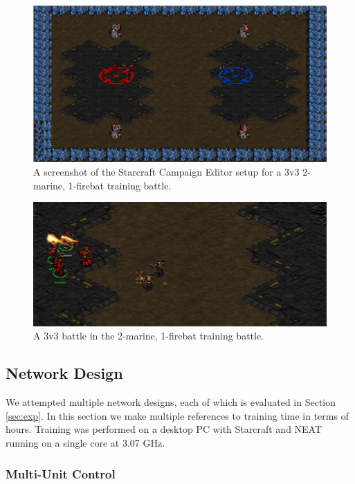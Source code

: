 \documentclass[10pt,a4paper,twocolumn]{article}
\begin{document}
\begin{figure}
\includegraphics[scale=.28]{figures/mf_setup.png}
\caption{A screenshot of the Starcraft Campaign Editor setup for a 3v3 2-marine, 1-firebat training battle.}
\end{figure}


\begin{figure}
\includegraphics[scale=.34]{figures/mf_battle_small.png}
\caption{A 3v3 battle in the 2-marine, 1-firebat training battle.}
\end{figure}

\subsection{Network Design}
\label{sec:net_design}

We attempted multiple network designs, each of which is evaluated in Section \ref{sec:exp}. In this section we make multiple references to training time in terms of hours. Training was performed on a desktop PC with Starcraft and NEAT running on a single core at 3.07 GHz. 

\subsubsection{Multi-Unit Control}
\label{sec:multiunit_design}
\end{document}
